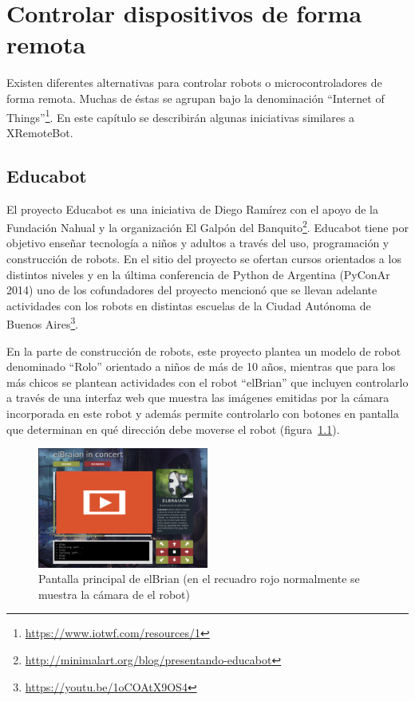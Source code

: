 \chapter{Controlar dispositivos de forma remota}\label{cha:arte}

Existen diferentes alternativas para controlar robots o microcontroladores
de forma remota. Muchas de éstas se agrupan bajo la denominación
``Internet of Things''\footnote{\url{https://www.iotwf.com/resources/1}}.
En este capítulo se describirán algunas iniciativas similares a XRemoteBot.

\section{Educabot}
El proyecto Educabot es una iniciativa de Diego Ramírez con el apoyo de
la Fundación Nahual y la organización
El Galpón del Banquito\footnote{\url{http://minimalart.org/blog/presentando-educabot}}.
Educabot tiene por
objetivo enseñar tecnología a niños y adultos a través
del uso, programación y construcción de robots. En el sitio del proyecto
se ofertan cursos orientados a los distintos niveles y
en la última conferencia de Python de Argentina (PyConAr 2014) uno de
los cofundadores del proyecto mencionó que se llevan adelante actividades
con los robots
en distintas escuelas de la Ciudad Autónoma de Buenos
Aires\footnote{\url{https://youtu.be/1oCOAtX9OS4}}.


En la parte de construcción de robots, este proyecto plantea un modelo
de robot denominado
``Rolo'' orientado a niños de más de 10 años, mientras que para los más
chicos se plantean actividades con el robot ``elBrian'' que incluyen
controlarlo a través de una interfaz web que muestra las imágenes emitidas
por la cámara incorporada en este robot y además permite controlarlo con
botones en pantalla que determinan en qué dirección debe moverse el robot
(figura~\ref{fig:elbrian}).

\begin{figure}
    \centering
    \includegraphics[width=0.5\textwidth]{figures/elbrian-1}
    \caption{Pantalla principal de elBrian (en el recuadro rojo normalmente
        se muestra la cámara de el robot)}
    \label{fig:elbrian}
\end{figure}

